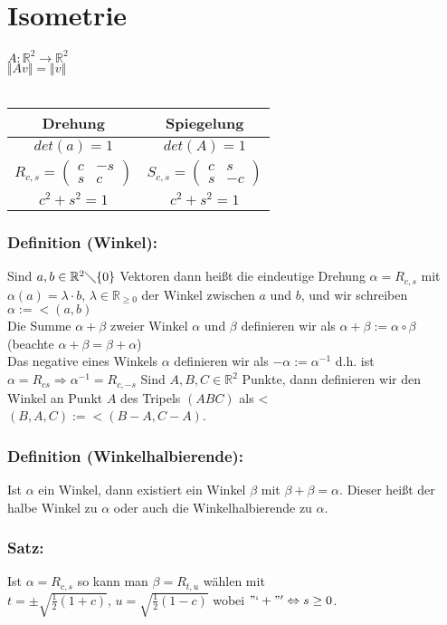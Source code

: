 \section{Isometrie}
$A: \mathbb{R}^{2} \rightarrow \mathbb{R}^{2}$\\
$\Vert Av \Vert = \Vert v \Vert$\\
\qquad\\
 \begin{tabular}{c|c}
 	Drehung & Spiegelung \\ \hline
  	$det(a) = 1$ & $det(A) = 1$ \\ 
  	$R_{c,s}=\begin{pmatrix} c & -s \\ s & c \end{pmatrix}$ & $S_{c,s} = \begin{pmatrix} c & s \\ s & -c \end{pmatrix}$\\
 	$c^{2}+s^{2} = 1$ & $c^{2}+s^{2} = 1$\\
 \end{tabular}
 \subsubsection{Definition (Winkel):}
 Sind $a,b \in \mathbb{R}^{2}\diagdown \{0\}$ Vektoren dann heißt die eindeutige Drehung $\alpha =R_{c,s}$ mit $\alpha(a)=\lambda\cdot b, \, \lambda \in \mathbb{R}_{\geq 0}$ der Winkel zwischen $a$ und $b$, und wir schreiben $\alpha := < (a,b)$\\
 Die Summe $\alpha + \beta$ zweier Winkel $\alpha$ und $\beta$ definieren wir als $\alpha + \beta := \alpha \circ \beta$ (beachte $\alpha + \beta = \beta + \alpha$)\\
 Das negative eines Winkels $\alpha$ definieren wir als $-\alpha := \alpha ^{-1}$ d.h. ist $\alpha = R_{cs} \Rightarrow \alpha^{-1} = R_{c,-s}$ Sind $A,B,C \in \mathbb{R}^{2}$ Punkte, dann definieren wir den Winkel an Punkt $A$ des Tripels $(ABC)$ als < $(B,A,C) := < (B-A,C-A)$. 
 \subsubsection{Definition (Winkelhalbierende):}
 Ist $\alpha$ ein Winkel, dann existiert ein Winkel $\beta$ mit $\beta + \beta = \alpha$. Dieser heißt der halbe Winkel zu $\alpha$ oder auch die Winkelhalbierende zu $\alpha$.
 \subsubsection{Satz:}
 Ist $\alpha = R_{c,s}$ so kann man $\beta = R_{t,u}$ wählen mit \\
 $t = \pm \sqrt{\frac{1}{2}(1+c)}, \, u=\sqrt{\frac{1}{2}(1-c)}$ wobei $"`+"' \Leftrightarrow s \geq 0$. 
